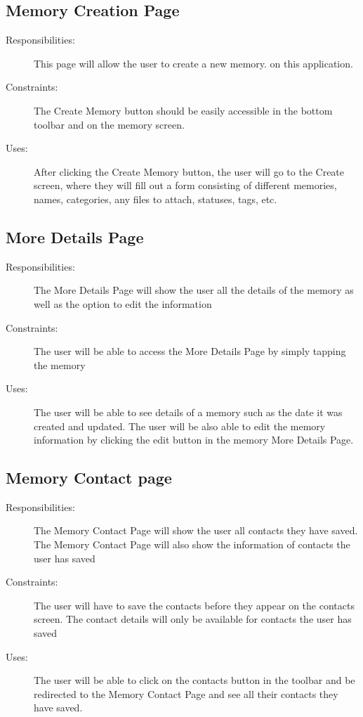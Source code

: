 \documentclass{article}
\begin{document}
\subsection{Memory Creation Page}
\begin{description}
\item[Responsibilities:] This page will allow the user to create a new memory.
on this application.
\item[Constraints:] The Create Memory button should be easily accessible in the bottom toolbar and on the memory screen.
\item[Uses:] After clicking the Create Memory button, the user will go to the Create screen, where they will fill out a form consisting of different memories, names, categories, any files to
attach, statuses, tags, etc.
\end{description}

\subsection{More Details Page}
\begin{description}
\item[Responsibilities:] The More Details Page will show the user all the details of the memory as well as the option to edit the information
\item[Constraints:] The user will be able to access the More Details Page by simply tapping the memory
\item[Uses:] The user will be able to see details of a memory such as the date it was created and updated. The user will be also able to edit the memory information by clicking the edit button in the memory More Details Page.
\end{description}

\subsection{Memory Contact page}
\begin{description}
\item[Responsibilities:] The Memory Contact Page will show the user all contacts they have saved. The Memory Contact Page will also show the information of contacts the user has saved
\item[Constraints:] The user will have to save the contacts before they appear on the contacts screen. The contact details will only be available for contacts the user has saved
\item[Uses:] The user will be able to click on the contacts button in the toolbar and be redirected to the Memory Contact Page and see all their contacts they have saved.
\end{description}
\end{document}
